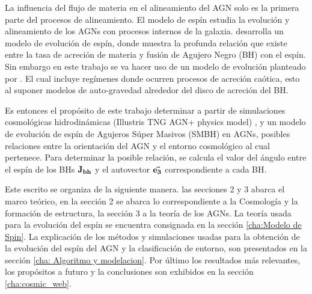 La influencia del flujo de materia en el alineamiento del AGN solo es la primera parte del procesos de alineamiento. El modelo de espín estudia la evolución y alineamiento de los AGNs con procesos internos de la galaxia. \cite{fanidakis2011} desarrolla un modelo de evolución de espín, donde muestra la profunda relación que existe entre la tasa de acreción de materia y fusión de Agujero Negro (BH) con el espín. Sin embargo en este trabajo se va hacer uso de un modelo de evolución planteado por \cite{Bustamante2018b}. El cual incluye regímenes donde ocurren procesos de acreción caótica, esto al suponer modelos de auto-gravedad alrededor del disco de acreción del BH. 
 
Es entonces el propósito de este trabajo determinar a partir de simulaciones cosmológicas hidrodinámicas (Illustris TNG AGN+ physics model) \cite{springel2010}, y un modelo de evolución de espín de Agujeros Súper Masivos (SMBH) en AGNs, posibles relaciones entre la orientación del AGN y el entorno cosmológico al cual pertenece. Para  determinar la posible relación, se calcula el valor del ángulo entre el espín de los BHs ${\bf{J_{bh}}}$ y el autovector $\vec{\bf{e_3}}$ correspondiente a cada BH.

Este escrito se organiza de la siguiente manera. las secciones 2 y 3 abarca el marco teórico, en la sección 2 se abarca lo correspondiente a la Cosmología y la formación de estructura, la sección 3 a la teoría de los AGNs. La teoría usada para la evolución del espín se encuentra consignada en la sección \ref{cha:Modelo de Spin}. La explicación de los métodos y simulaciones usadas para la obtención de la evolución del espín del AGN y la clasificación de entorno, son presentados en la sección \ref{cha: Algoritmo y modelacion}. Por último los resultados más relevantes, los propósitos a futuro y la conclusiones son exhibidos en la sección \ref{cha:cosmic_web}.

